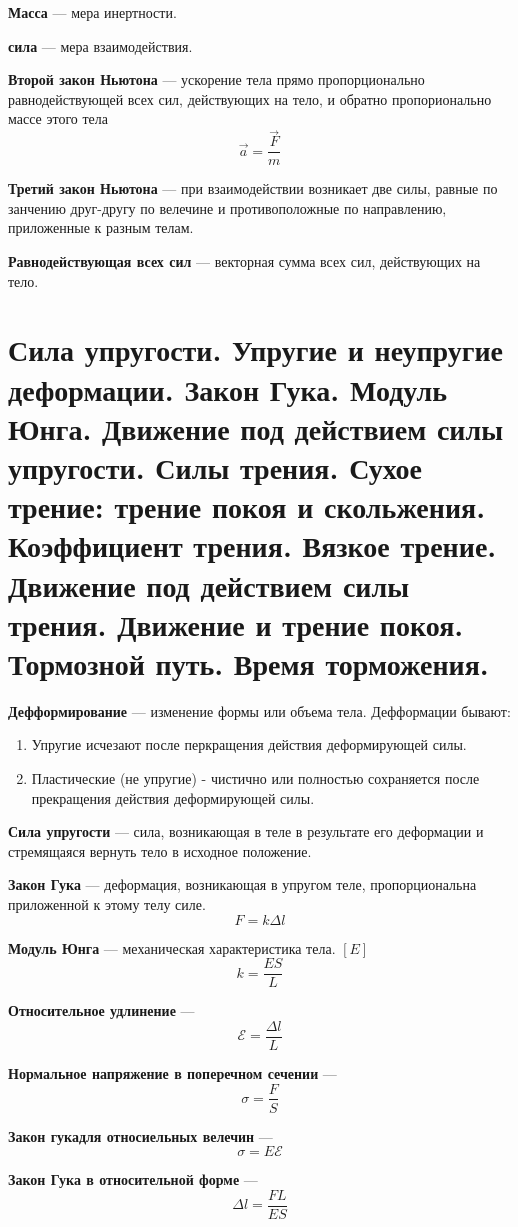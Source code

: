 \documentclass{report}
\begin{document}
{\bf Масса} ---
мера инертности.

{\bf сила} ---
мера взаимодействия.

{\bf Второй закон Ньютона} ---
ускорение тела прямо пропорционально равнодействующей всех сил, действующих на тело, и обратно
пропорионально массе этого тела
$$
\vec{a}=\frac{\vec{F}}{m}
$$

{\bf Третий закон Ньютона} ---
при взаимодействии возникает две силы, равные по занчению друг-другу по велечине и противоположные
по направлению, приложенные к разным телам.

{\bf Равнодействующая всех сил} ---
векторная сумма всех сил, действующих на тело.



\part{Сила упругости. 
Упругие и неупругие деформации. 
Закон Гука. 
Модуль Юнга. 
Движение под действием силы упругости. 
Силы трения. 
Сухое трение: трение покоя и скольжения. 
Коэффициент трения. 
Вязкое трение. 
Движение под действием силы трения. 
Движение и трение покоя. 
Тормозной путь. 
Время торможения.}

{\bf Дефформирование} ---
изменение формы или объема тела. Дефформации бывают:
\begin{enumerate}
  \item Упругие исчезают после перкращения действия деформирующей силы.
  \item Пластические (не упругие) - чистично или полностью сохраняется после прекращения действия 
  деформирующей силы.
\end{enumerate}

{\bf Сила упругости} ---
сила, возникающая в теле в результате его деформации и стремящаяся вернуть тело в исходное положение.

{\bf Закон Гука} ---
деформация, возникающая в упругом теле, пропорциональна приложенной к этому телу силе.
$$
F=k\Delta l
$$

{\bf Модуль Юнга} ---
механическая характеристика тела. $[E]$
$$
k=\frac{ES}{L}
$$

{\bf Относительное удлинение} ---
$$
\mathcal{E}=\frac{\Delta l}{L}
$$

{\bf Нормальное напряжение в поперечном сечении} ---
$$
\sigma=\frac{F}{S}
$$

{\bf Закон гукадля относиельных велечин} ---
$$
\sigma =E\mathcal{E}
$$

{\bf Закон Гука в относительной форме} ---
$$
\Delta l=\frac{FL}{ES}
$$
\end{document}
